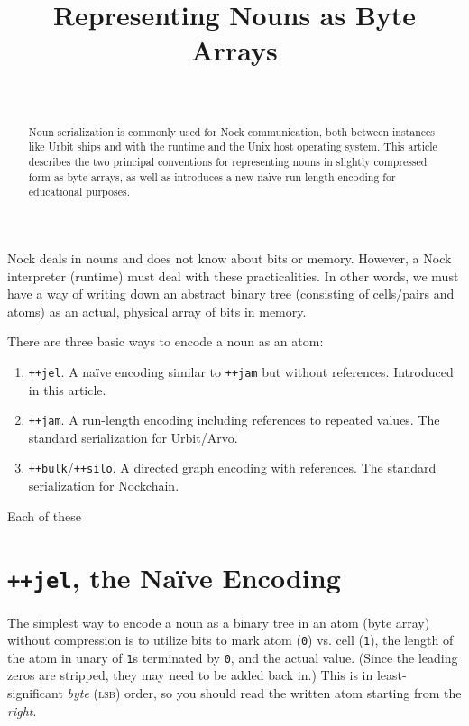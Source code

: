 \documentclass[twoside]{article}
\title{Representing Nouns as Byte Arrays}
\author{\authorname~\authorpatp \\ \affiliation}
\date{}
\begin{document}
\maketitle
\thispagestyle{firststyle}

\begin{abstract}
  Noun serialization is commonly used for Nock communication, both between instances like Urbit ships and with the runtime and the Unix host operating system.  This article describes the two principal conventions for representing nouns in slightly compressed form as byte arrays, as well as introduces a new na\"ive run-length encoding for educational purposes.
\end{abstract}

\setcounter{page}{1}

\tableofcontents

Nock deals in nouns and does not know about bits or memory.  However, a Nock interpreter (runtime) must deal with these practicalities.  In other words, we must have a way of writing down an abstract binary tree (consisting of cells/pairs and atoms) as an actual, physical array of bits in memory.

There are three basic ways to encode a noun as an atom:

\begin{enumerate}
  \item  \texttt{++jel}.  A na\"{i}ve encoding similar to \texttt{++jam} but without references.  Introduced in this article.
  \item  \texttt{++jam}.  A run-length encoding including references to repeated values.  The standard serialization for Urbit/Arvo.
  \item  \texttt{++bulk}/\texttt{++silo}.  A directed graph encoding with references.  The standard serialization for Nockchain.
\end{enumerate}

\noindent{}
Each of these

\section{\texttt{++jel}, the Na\"{i}ve Encoding}

The simplest way to encode a noun as a binary tree in an atom (byte array) without compression is to utilize bits to mark atom (\texttt{0}) vs. cell (\texttt{1}), the length of the atom in unary of \texttt{1}s terminated by \texttt{0}, and the actual value.  (Since the leading zeros are stripped, they may need to be added back in.)  This is in least-significant \emph{byte} (\textsc{lsb}) order, so you should read the written atom starting from the \emph{right}.
\end{document}
